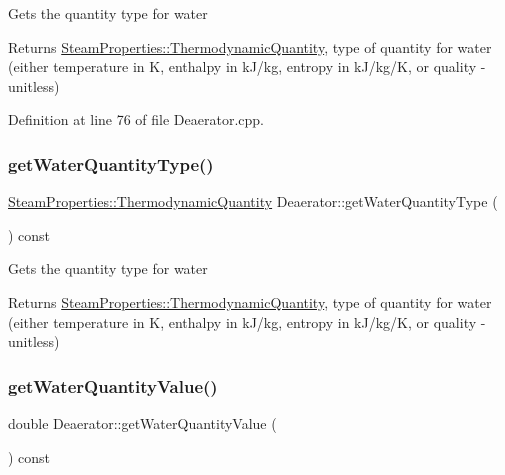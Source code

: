 Gets the quantity type for water \begin{DoxyReturn}{Returns}
\hyperlink{class_steam_properties_ae0294bedf7d178c2d8fb6aed0f62fbff}{Steam\+Properties\+::\+Thermodynamic\+Quantity}, type of quantity for water (either temperature in K, enthalpy in k\+J/kg, entropy in k\+J/kg/K, or quality -\/ unitless) 
\end{DoxyReturn}


Definition at line 76 of file Deaerator.\+cpp.

\mbox{\label{class_deaerator_a414282f81906e09a28bc75cf51659ec2}} 
\subsubsection{\texorpdfstring{get\+Water\+Quantity\+Type()}{getWaterQuantityType()}\hspace{0.1cm}{\footnotesize\ttfamily [3/3]}}
{\footnotesize\ttfamily \hyperlink{class_steam_properties_ae0294bedf7d178c2d8fb6aed0f62fbff}{Steam\+Properties\+::\+Thermodynamic\+Quantity} Deaerator\+::get\+Water\+Quantity\+Type (\begin{DoxyParamCaption}{ }\end{DoxyParamCaption}) const}

Gets the quantity type for water \begin{DoxyReturn}{Returns}
\hyperlink{class_steam_properties_ae0294bedf7d178c2d8fb6aed0f62fbff}{Steam\+Properties\+::\+Thermodynamic\+Quantity}, type of quantity for water (either temperature in K, enthalpy in k\+J/kg, entropy in k\+J/kg/K, or quality -\/ unitless) 
\end{DoxyReturn}
\mbox{\label{class_deaerator_a9362430fb04802b6f14c9bf09d62a466}} 
\subsubsection{\texorpdfstring{get\+Water\+Quantity\+Value()}{getWaterQuantityValue()}\hspace{0.1cm}{\footnotesize\ttfamily [1/3]}}
{\footnotesize\ttfamily double Deaerator\+::get\+Water\+Quantity\+Value (\begin{DoxyParamCaption}{ }\end{DoxyParamCaption}) const}

